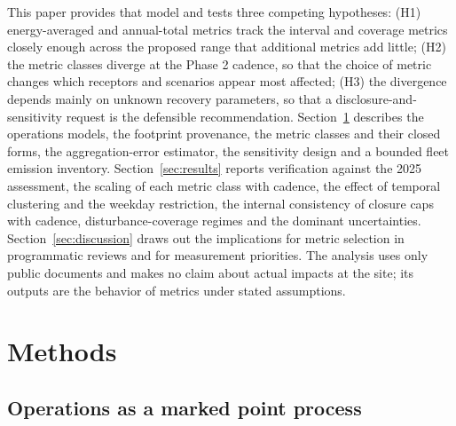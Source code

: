 \documentclass[preprint,12pt,authoryear]{elsarticle}
\begin{document}
This paper provides that model and tests three competing hypotheses: (H1) energy-averaged and annual-total metrics track the interval and coverage metrics closely enough across the proposed range that additional metrics add little; (H2) the metric classes diverge at the Phase 2 cadence, so that the choice of metric changes which receptors and scenarios appear most affected; (H3) the divergence depends mainly on unknown recovery parameters, so that a disclosure-and-sensitivity request is the defensible recommendation. Section~\ref{sec:methods} describes the operations models, the footprint provenance, the metric classes and their closed forms, the aggregation-error estimator, the sensitivity design and a bounded fleet emission inventory. Section~\ref{sec:results} reports verification against the 2025 assessment, the scaling of each metric class with cadence, the effect of temporal clustering and the weekday restriction, the internal consistency of closure caps with cadence, disturbance-coverage regimes and the dominant uncertainties. Section~\ref{sec:discussion} draws out the implications for metric selection in programmatic reviews and for measurement priorities. The analysis uses only public documents and makes no claim about actual impacts at the site; its outputs are the behavior of metrics under stated assumptions.

\section{Methods}
\label{sec:methods}

\subsection{Operations as a marked point process}
\end{document}
